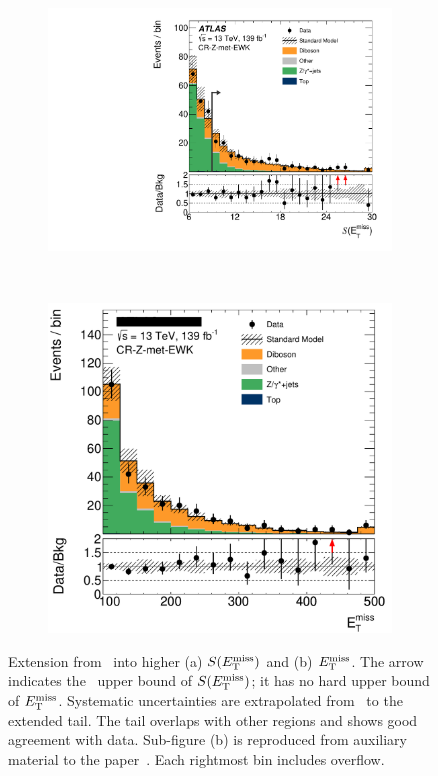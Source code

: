 \begin{figure}[tp]
\centering
\begin{subfigure}{0.62\textwidth}
\centering
\includegraphics[width=\textwidth]{figures/2ljets_aux_CR_Z_met_EWK_met_Sign.pdf}
\caption{}
\label{fig:2ljets_low_crz_extensions_metsig}
\end{subfigure}
\\
\begin{subfigure}{0.62\textwidth}
\centering
\includegraphics[width=\textwidth]{figures/2ljets_aux_CR_Z_met_EWK_met_Et.png}
\caption{}
\label{fig:2ljets_low_crz_extensions_met}
\end{subfigure}
\caption[
Extension from CR-Z into higher $\metsig$ and $\met$
]{%
Extension from \crz\ into higher (a) $\metsig$ and (b) $\met$.
The arrow indicates the \crz\  upper bound of $\metsig$; it has no hard
upper bound of $\met$.
Systematic uncertainties are extrapolated from \crz\ to the extended tail.
The tail overlaps with other regions and shows good agreement with data.
Sub-figure (b) is reproduced from auxiliary material to the
paper~\cite{atlas2022searches}.
Each rightmost bin includes overflow.
}
\label{fig:2ljets_low_crz_extensions}
\end{figure}

